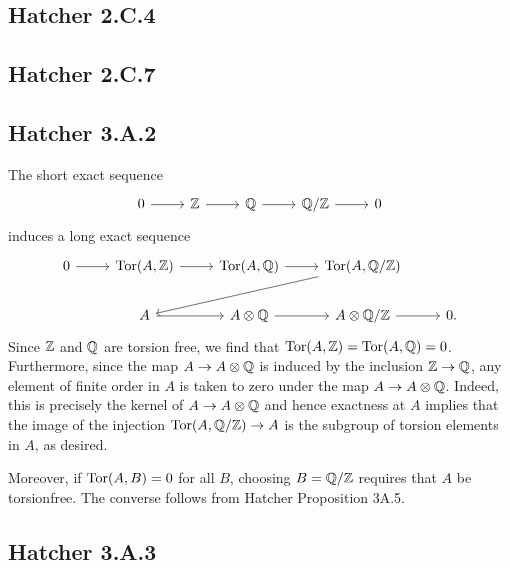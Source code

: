 \documentclass{../mathnotes}
\begin{document}
\subsection*{Hatcher 2.C.4}

\subsection*{Hatcher 2.C.7}

\subsection*{Hatcher 3.A.2}

The short exact sequence
\begin{equation*}
    \begin{tikzcd}
        0\ar{r} & \Z\ar{r} & \Q\ar{r} & \Q/\Z\ar{r} & 0
    \end{tikzcd}
\end{equation*}
induces a long exact sequence
\begin{equation*}
    \begin{tikzcd}
        0\ar{r}&\Tor(A,\Z)\ar{r} & \Tor(A,\Q)\ar{r} & \Tor(A,\Q/\Z)\ar{lld}\\
        & A\ar{r} & A\otimes\Q\ar{r} & A\otimes\Q/\Z\ar{r} & 0.
    \end{tikzcd}
\end{equation*}
Since $\mathbb{Z}$ and $\mathbb{Q}$ are torsion free, we find that $\operatorname{Tor}(A,\mathbb{Z})=\operatorname{Tor}(A,\mathbb{Q})=0$.
Furthermore, since the map $A\to A\otimes\mathbb{Q}$ is induced by the inclusion $\mathbb{Z}\to\mathbb{Q}$,
any element of finite order in $A$ is taken to zero under the map $A\to A\otimes\mathbb{Q}$.
Indeed, this is precisely the kernel of $A\to A\otimes\mathbb{Q}$ and hence exactness at $A$ 
implies that the image of the injection $\operatorname{Tor}(A,\mathbb{Q}/\mathbb{Z})\to A$ is the subgroup of
torsion elements in $A$, as desired.

Moreover, if $\operatorname{Tor}(A,B)=0$ for all $B$, choosing $B=\mathbb{Q}/\mathbb{Z}$ requires that $A$ be torsionfree.
The converse follows from Hatcher Proposition 3A.5.

\subsection*{Hatcher 3.A.3}
\end{document}

